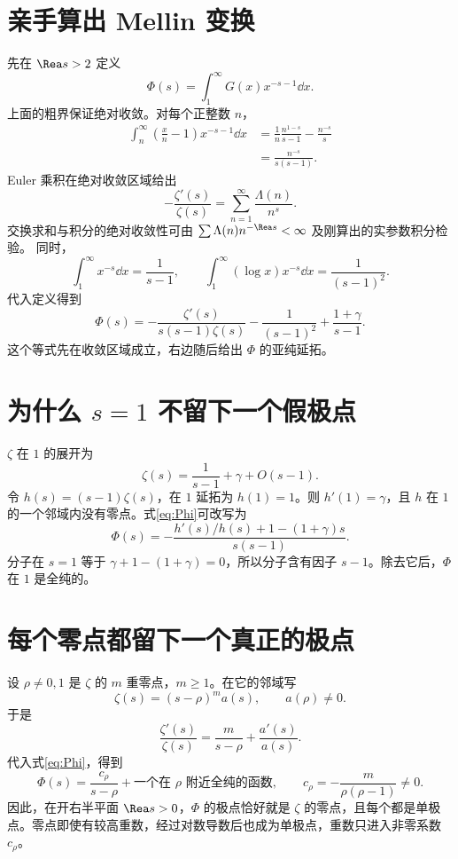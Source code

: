 \section{亲手算出 Mellin 变换}
先在 $\Rea s>2$ 定义
\[
\Phi(s)=\int_1^\infty G(x)x^{-s-1}\dd x.
\]
上面的粗界保证绝对收敛。对每个正整数 $n$，
\begin{align*}
\int_n^\infty\left(\frac{x}{n}-1\right)x^{-s-1}\dd x
&=\frac1n\frac{n^{1-s}}{s-1}-\frac{n^{-s}}s\\
&=\frac{n^{-s}}{s(s-1)}.
\end{align*}
Euler 乘积在绝对收敛区域给出
\[
-\frac{\zeta'(s)}{\zeta(s)}
=\sum_{n=1}^\infty\frac{\Lambda(n)}{n^s}.
\]
交换求和与积分的绝对收敛性可由
$\sum\Lambda(n)n^{-\Rea s}<\infty$ 及刚算出的实参数积分检验。
同时，
\[
\int_1^\infty x^{-s}\dd x=\frac1{s-1},\qquad
\int_1^\infty(\log x)x^{-s}\dd x=\frac1{(s-1)^2}.
\]
代入定义得到
\begin{equation}
\boxed{\displaystyle
\Phi(s)=-\frac{\zeta'(s)}{s(s-1)\zeta(s)}
-\frac1{(s-1)^2}+\frac{1+\gamma}{s-1}.}
\label{eq:Phi}
\end{equation}
这个等式先在收敛区域成立，右边随后给出 $\Phi$ 的亚纯延拓。

\section{为什么 \texorpdfstring{$s=1$}{s=1} 不留下一个假极点}
$\zeta$ 在 $1$ 的展开为
\[
\zeta(s)=\frac1{s-1}+\gamma+O(s-1).
\]
令 $h(s)=(s-1)\zeta(s)$，在 $1$ 延拓为 $h(1)=1$。则
$h'(1)=\gamma$，且 $h$ 在 $1$ 的一个邻域内没有零点。式\eqref{eq:Phi}可改写为
\begin{equation}
\Phi(s)=-\frac{h'(s)/h(s)+1-(1+\gamma)s}{s(s-1)}.
\label{eq:Phi-regularized}
\end{equation}
分子在 $s=1$ 等于 $\gamma+1-(1+\gamma)=0$，所以分子含有因子 $s-1$。除去它后，$\Phi$ 在 $1$ 是全纯的。


\section{每个零点都留下一个真正的极点}
设 $\rho\ne0,1$ 是 $\zeta$ 的 $m$ 重零点，$m\ge1$。在它的邻域写
\[
\zeta(s)=(s-\rho)^m a(s),\qquad a(\rho)\ne0.
\]
于是
\[
\frac{\zeta'(s)}{\zeta(s)}=
\frac m{s-\rho}+\frac{a'(s)}{a(s)}.
\]
代入式\eqref{eq:Phi}，得到
\begin{equation}
\Phi(s)=\frac{c_\rho}{s-\rho}+\text{一个在 $\rho$ 附近全纯的函数},
\qquad c_\rho=-\frac{m}{\rho(\rho-1)}\ne0.
\label{eq:residue}
\end{equation}
因此，在开右半平面 $\Rea s>0$，$\Phi$ 的极点恰好就是 $\zeta$ 的零点，且每个都是单极点。零点即使有较高重数，经过对数导数后也成为单极点，重数只进入非零系数 $c_\rho$。

